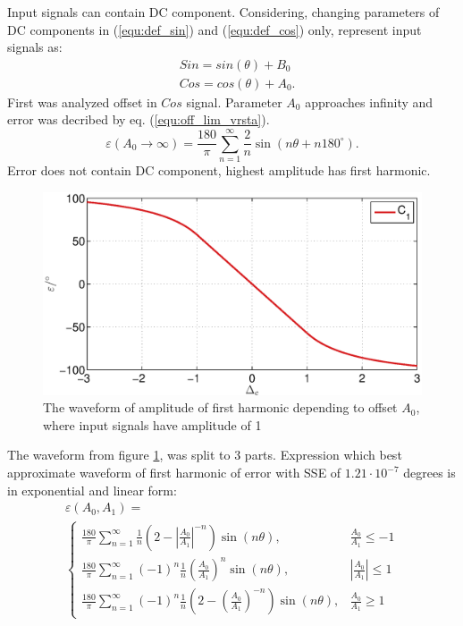 \documentclass[a4paper]{article}
\begin{document}
Input signals can contain DC component.
Considering, changing parameters of DC components in (\ref{equ:def_sin}) and (\ref{equ:def_cos}) only, represent input signals as:
\begin{eqnarray}
&Sin = sin(\theta)+ B_0\\
&Cos = cos(\theta) + A_0.
\end{eqnarray}
First was analyzed offset in $Cos$ signal. Parameter $A_0$ approaches infinity and error was decribed by eq. (\ref{equ:off_lim_vrsta}).
\begin{equation}
\label{equ:off_lim_vrsta}
\varepsilon (A_0 \rightarrow \infty) = \frac{180}{\pi}\sum_{n=1}^{\infty}\frac{2}{n} \sin (n \theta + n 180^\circ).
\end{equation}
Error does not contain DC component, highest amplitude has first harmonic.
\begin{figure}[!htb]
	\begin{center}
		\includegraphics[width=\linewidth]{./Slike/off.eps}
		\caption{The waveform of amplitude of first harmonic depending to offset  $A_0$, where input signals have amplitude of 1 } \label{fig:off}
	\end{center}
\end{figure}
The waveform from figure \ref{fig:off}, was split to 3 parts. Expression which best approximate waveform of first harmonic of error with SSE of $1.21 \cdot 10^{-7}$ degrees is in exponential and linear form:
\begin{multline}
\label{equ:offc_err}
\varepsilon(A_0, A_1)=\\
\begin{cases}
\frac{180}{\pi}\sum_{n=1}^{\infty} \frac{1}{n}(2-|\frac{A_0}{A_1}|^{-n}) \sin (n \theta ), & \frac{A_0}{A_1}\leq -1 \\
\frac{180}{\pi}\sum_{n=1}^{\infty}(-1)^n\frac{1}{n}(\frac{A_0}{A_1})^n \sin (n \theta ), & |\frac{A_0}{A_1}|\leq 1 \\
\frac{180}{\pi}\sum_{n=1}^{\infty}(-1)^n\frac{1}{n}(2-(\frac{A_0}{A_1})^{-n}) \sin (n \theta ), & \frac{A_0}{A_1}\geq 1
\end{cases}
\end{multline}
\end{document}
